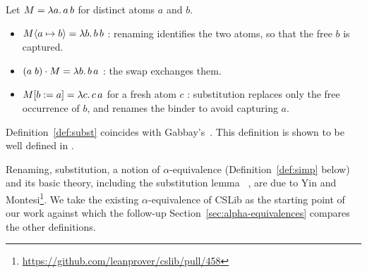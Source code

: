 \begin{example}
\label{ex:operations}
Let $M = \lambda a.\,a\,b$ for distinct atoms $a$ and $b$.
\begin{itemize}
  \item $M\langle a \mapsto b\rangle = \lambda b.\,b\,b$
    : renaming identifies the two atoms, so that
    the free $b$ is captured.
  \item $(a\;b) \cdot M = \lambda b.\,b\,a$
    : the swap exchanges them.
  \item $M[b \mathrel{{:}{=}} a] = \lambda c.\,c\,a$ for a fresh atom $c$
    : substitution replaces only the free
    occurrence of $b$, and renames the binder to avoid capturing $a$.
\end{itemize}
\end{example}

Definition~\ref{def:subst} coincides with Gabbay's~\cite[Definition~5.13]{gabbay2011a}.
This definition is shown to be well defined in \cite[Lemma~5.14]{gabbay2011a}.

Renaming, substitution, a notion of $\alpha$-equivalence
(Definition~\ref{def:simp} below) and its basic theory, including the substitution
lemma~\cite[Lemma~2.1.16]{barendregt1985a}
,
are due to Yin and Montesi\footnote{\url{https://github.com/leanprover/cslib/pull/458}}.
We take the existing $\alpha$-equivalence of CSLib as the starting point of our work against
which the follow-up Section~\ref{sec:alpha-equivalences} compares the other definitions.

